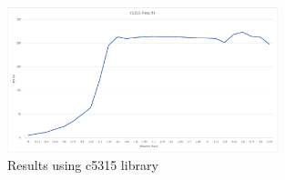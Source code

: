 \documentclass{article}
\begin{document}
	\begin{figure}[ht]
		\centering
		\includegraphics[width=0.7\textwidth]{Immagini/c5315}
		\caption{Results using c5315 library}
		\label{benchmark3}
	\end{figure}
	
	
\end{document}
